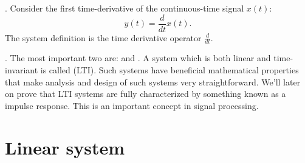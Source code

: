 . Consider the first time-derivative of the continuous-time signal $x(t)$:
\begin{equation}
y(t) = \frac{d}{d t}x(t).
\end{equation}
The system definition is the time derivative operator $\frac{d}{dt}$.

. The
most important two are: \emph{} and \emph{}. A
system which is both linear and time-invariant is called 
(LTI). Such systems have beneficial mathematical properties
that make analysis and design of such systems very
straightforward. We'll later on prove that LTI systems are fully
characterized by something known as a impulse response. This is an
important concept in signal processing.

\section{Linear system}

